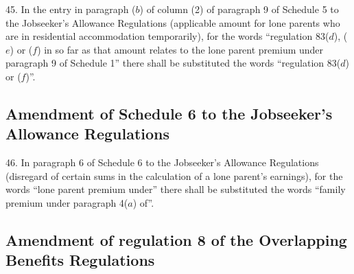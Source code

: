 \documentclass[12pt,a4paper]{article}
\begin{document}
45.  In the entry in paragraph ($b$) of column (2) of paragraph 9 of Schedule 5 to the Jobseeker’s Allowance Regulations (applicable amount for lone parents who are in residential accommodation temporarily), for the words “regulation 83($d$), ($e$) or ($f$) in so far as that amount relates to the lone parent premium under paragraph 9 of Schedule 1” there shall be substituted the words “regulation 83($d$) or ($f$)”.

\subsection[46. Amendment of Schedule 6 to the Jobseeker’s Allowance Regulations]{Amendment of Schedule 6 to the Jobseeker’s Allowance Regulations}

46.  In paragraph 6 of Schedule 6 to the Jobseeker’s Allowance Regulations (disregard of certain sums in the calculation of a lone parent’s earnings), for the words “lone parent premium under” there shall be substituted the words “family premium under paragraph 4($a$) of”.

\subsection[47. Amendment of regulation 8 of the Overlapping Benefits Regulations]{Amendment of regulation 8 of the Overlapping Benefits Regulations}
\end{document}
